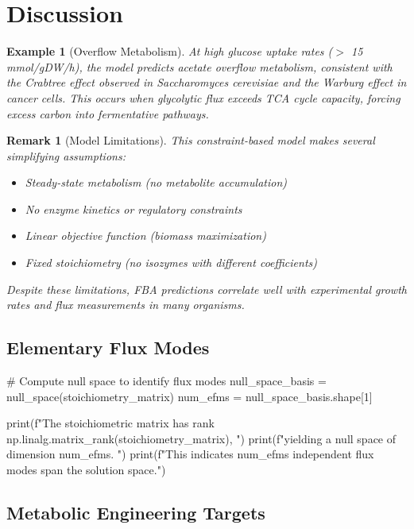 \documentclass[a4paper, 11pt]{article}
\newtheorem{example}{Example}[section]
\newtheorem{remark}{Remark}[section]
\begin{document}
\section{Discussion}

\begin{example}[Overflow Metabolism]
At high glucose uptake rates ($>$ 15 mmol/gDW/h), the model predicts acetate overflow metabolism,
consistent with the Crabtree effect observed in \textit{Saccharomyces cerevisiae} and the Warburg
effect in cancer cells. This occurs when glycolytic flux exceeds TCA cycle capacity, forcing excess
carbon into fermentative pathways.
\end{example}

\begin{remark}[Model Limitations]
This constraint-based model makes several simplifying assumptions:
\begin{itemize}
\item Steady-state metabolism (no metabolite accumulation)
\item No enzyme kinetics or regulatory constraints
\item Linear objective function (biomass maximization)
\item Fixed stoichiometry (no isozymes with different coefficients)
\end{itemize}
Despite these limitations, FBA predictions correlate well with experimental growth rates and
flux measurements in many organisms.
\end{remark}

\subsection{Elementary Flux Modes}

\begin{pycode}
# Compute null space to identify flux modes
null_space_basis = null_space(stoichiometry_matrix)
num_efms = null_space_basis.shape[1]

print(f"The stoichiometric matrix has rank {np.linalg.matrix_rank(stoichiometry_matrix)}, ")
print(f"yielding a null space of dimension {num_efms}. ")
print(f"This indicates {num_efms} independent flux modes span the solution space.")
\end{pycode}

\subsection{Metabolic Engineering Targets}
\end{document}
